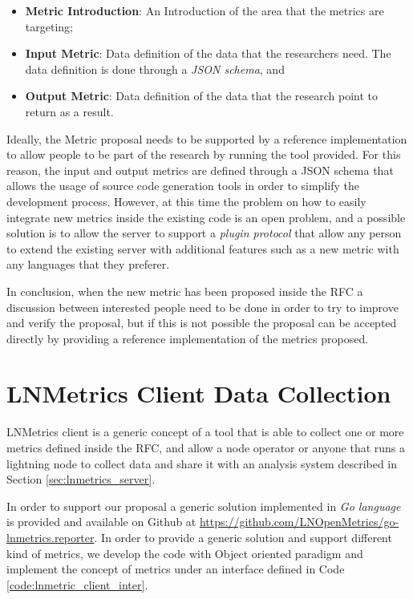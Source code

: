 \begin{itemize}
    \item {\bf Metric Introduction}: An Introduction of the area that the metrics are targeting;
    \item {\bf Input Metric}: Data definition of the data that the researchers need. The data definition is done through a \emph{JSON schema}, and
    \item {\bf Output Metric}: Data definition of the data that the research point to return as a result. 
\end{itemize}

Ideally, the Metric proposal needs to be supported by a reference implementation to 
allow people to be part of the research by running the tool provided.
For this reason, the input and output metrics are defined through a JSON schema 
that allows the usage of source code generation tools in order to simplify the development process.
However, at this time the problem on how to easily integrate new metrics inside the 
existing code is an open problem, and a possible solution is to allow the server 
to support a \emph{plugin protocol} that allow any person to extend the existing 
server with additional features such as a new metric with any languages that they preferer.

In conclusion, when the new metric has been proposed inside the RFC a discussion between interested 
people need to be done in order to try to improve and verify the proposal, but if this is not possible
the proposal can be accepted directly by providing a reference implementation of the metrics proposed.

\section{LNMetrics Client Data Collection}

LNMetrics client is a generic concept of a tool that is able to collect one or more metrics 
defined inside the RFC, and allow a node operator or anyone that runs a lightning node
to collect data and share it with an analysis system described in Section \ref{sec:lnmetrics_server}.

In order to support our proposal a generic solution implemented in \emph{Go language} is provided 
and available on Github at \url{https://github.com/LNOpenMetrics/go-lnmetrics.reporter}. In order to 
provide a generic solution and support different kind of metrics, we develop the code with 
Object oriented paradigm and implement the concept of metrics under an interface defined 
in Code \ref{code:lnmetric_client_inter}.

